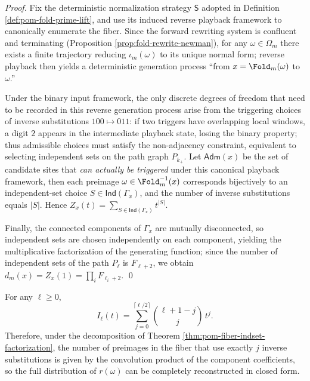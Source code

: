 \begin{proof}
Fix the deterministic normalization strategy \(\mathsf S\) adopted in Definition \ref{def:pom-fold-prime-lift}, and use its induced reverse playback framework to canonically enumerate the fiber.
Since the forward rewriting system is confluent and terminating (Proposition \ref{prop:fold-rewrite-newman}), for any \(\omega\in\Omega_m\) there exists a finite trajectory reducing \(\iota_m(\omega)\) to its unique normal form; reverse playback then yields a deterministic generation process ``from \(x=\Fold_m(\omega)\) to \(\omega\).''
\par
Under the binary input framework, the only discrete degrees of freedom that need to be recorded in this reverse generation process arise from the triggering choices of inverse substitutions \(100\mapsto 011\): if two triggers have overlapping local windows, a digit \(2\) appears in the intermediate playback state, losing the binary property; thus admissible choices must satisfy the non-adjacency constraint, equivalent to selecting independent sets on the path graph \(P_{k_{+}}\).
Let \(\mathsf{Adm}(x)\) be the set of candidate sites that \emph{can actually be triggered} under this canonical playback framework, then each preimage \(\omega\in\Fold_m^{-1}(x)\) corresponds bijectively to an independent-set choice \(S\in\mathsf{Ind}(\Gamma_x)\), and the number of inverse substitutions equals \(|S|\).
Hence \(Z_x(t)=\sum_{S\in\mathsf{Ind}(\Gamma_x)}t^{|S|}\).
\par
Finally, the connected components of \(\Gamma_x\) are mutually disconnected, so independent sets are chosen independently on each component, yielding the multiplicative factorization of the generating function;
since the number of independent sets of the path \(P_\ell\) is \(F_{\ell+2}\), we obtain \(d_m(x)=Z_x(1)=\prod_i F_{\ell_i+2}\). \qed
\end{proof}

\begin{theorem}\label{thm:pom-path-indset-poly-closed}
For any \(\ell\ge 0\),
\[
I_{\ell}(t)=\sum_{j=0}^{\lceil \ell/2\rceil}\binom{\ell+1-j}{j}\,t^j.
\]
Therefore, under the decomposition of Theorem \ref{thm:pom-fiber-indset-factorization}, the number of preimages in the fiber that use exactly \(j\) inverse substitutions is given by the convolution product of the component coefficients, so the full distribution of \(r(\omega)\) can be completely reconstructed in closed form.
\end{theorem}

